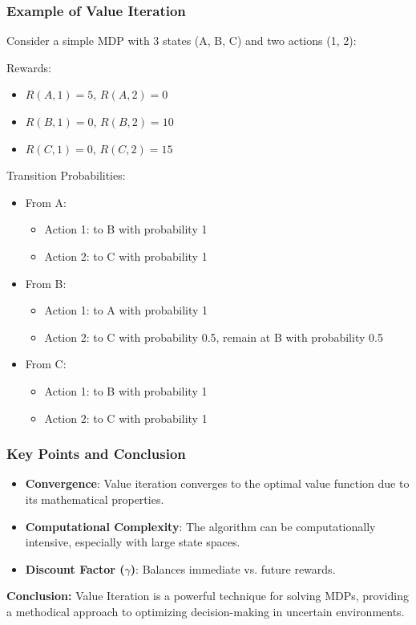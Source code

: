\documentclass[aspectratio=169]{beamer}
\begin{document}
\begin{frame}[fragile]
    \frametitle{Example of Value Iteration}
    Consider a simple MDP with 3 states (A, B, C) and two actions (1, 2):
    
    \begin{block}{Rewards:}
        \begin{itemize}
            \item \( R(A, 1) = 5 \), \( R(A, 2) = 0 \)
            \item \( R(B, 1) = 0 \), \( R(B, 2) = 10 \)
            \item \( R(C, 1) = 0 \), \( R(C, 2) = 15 \)
        \end{itemize}
    \end{block}
    
    \begin{block}{Transition Probabilities:}
        \begin{itemize}
            \item From A: 
              \begin{itemize}
                \item Action 1: to B with probability 1
                \item Action 2: to C with probability 1
              \end{itemize}
            \item From B: 
              \begin{itemize}
                \item Action 1: to A with probability 1
                \item Action 2: to C with probability 0.5, remain at B with probability 0.5
              \end{itemize}
            \item From C: 
              \begin{itemize}
                \item Action 1: to B with probability 1
                \item Action 2: to C with probability 1
              \end{itemize}
        \end{itemize}
    \end{block}
\end{frame}

\begin{frame}[fragile]
    \frametitle{Key Points and Conclusion}
    \begin{itemize}
        \item \textbf{Convergence}: Value iteration converges to the optimal value function due to its mathematical properties.
        \item \textbf{Computational Complexity}: The algorithm can be computationally intensive, especially with large state spaces.
        \item \textbf{Discount Factor (\( \gamma \))}: Balances immediate vs. future rewards.
    \end{itemize}

    \textbf{Conclusion:} Value Iteration is a powerful technique for solving MDPs, providing a methodical approach to optimizing decision-making in uncertain environments.
\end{frame}
\end{document}
